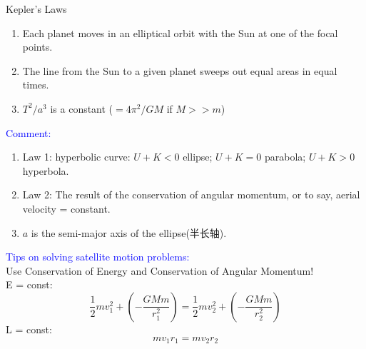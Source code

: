 \documentclass{beamer}
\begin{document}
\begin{frame}
  \begin{block}{Kepler's Laws}
    \begin{enumerate}
      \item Each planet moves in an elliptical orbit with the Sun at one
      of the focal points.
      \item The line from the Sun to a given planet sweeps out equal
      areas in equal times.
      \item $T^2/a^3$ is a constant ($=4\pi^2/GM$ if $M>>m$)
    \end{enumerate}
  \end{block}
  \textcolor{blue}{Comment:}\\
  \begin{enumerate}
    \item Law 1: hyperbolic curve: $U+K<0$ ellipse; $U+K=0$ parabola; $U+K>0$ hyperbola.
    \item Law 2: The result of the conservation of angular momentum, or to say, aerial velocity = constant.
    \item $a$ is the semi-major axis of the ellipse(半长轴).
  \end{enumerate}
\end{frame}
\begin{frame}
  \textcolor{blue}{Tips on solving satellite motion problems:}\\
  Use Conservation of Energy and Conservation of Angular Momentum!\\
  E = const: $$\frac{1}{2}mv_1^2 + (-\frac{GMm}{r_1^2}) = \frac{1}{2}mv_2^2 + (-\frac{GMm}{r_2^2})$$
  L = const: $$mv_1r_1 = mv_2r_2$$ 
\end{frame}
\end{document}
